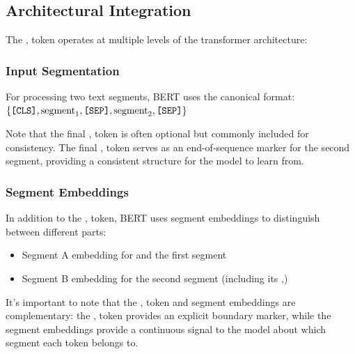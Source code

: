 \subsection{Architectural Integration}

The \sep{} token operates at multiple levels of the transformer architecture:

\subsubsection{Input Segmentation}
For processing two text segments, BERT uses the canonical format:\\
$\{\texttt{[CLS]}{}, \text{segment}_1, \texttt{[SEP]}{}, \text{segment}_2, \texttt{[SEP]}{}\}$

Note that the final \sep{} token is often optional but commonly included for consistency. The final \sep{} token serves as an end-of-sequence marker for the second segment, providing a consistent structure for the model to learn from.

\subsubsection{Segment Embeddings}
In addition to the \sep{} token, BERT uses segment embeddings to distinguish between different parts:
\begin{itemize}
\item Segment A embedding for \cls{} and the first segment
\item Segment B embedding for the second segment (including its \sep{})
\end{itemize}

It's important to note that the \sep{} token and segment embeddings are complementary: the \sep{} token provides an explicit boundary marker, while the segment embeddings provide a continuous signal to the model about which segment each token belongs to.

